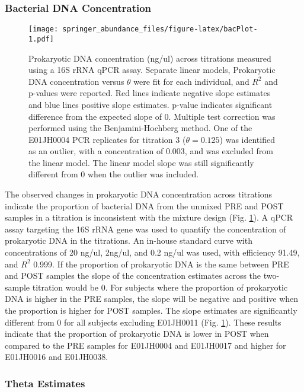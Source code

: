 \documentclass[smallextended]{svjour3}       %
\begin{document}
\hypertarget{bacterial-dna-concentration}{%
\subsubsection{Bacterial DNA
Concentration}\label{bacterial-dna-concentration}}

\begin{figure}
\centering
\texttt{[image: springer\_abundance\_files/figure-latex/bacPlot-1.pdf]}
\caption{\label{fig:bacPlot}Prokaryotic DNA concentration (ng/ul) across
titrations measured using a 16S rRNA qPCR assay. Separate linear models,
Prokaryotic DNA concentration versus \(\theta\) were fit for each
individual, and \(R^2\) and p-values were reported. Red lines indicate
negative slope estimates and blue lines positive slope estimates.
p-value indicates significant difference from the expected slope of 0.
Multiple test correction was performed using the Benjamini-Hochberg
method. One of the E01JH0004 PCR replicates for titration 3
(\(\theta=0.125\)) was identified as an outlier, with a concentration of
0.003, and was excluded from the linear model. The linear model slope
was still significantly different from 0 when the outlier was included.}
\end{figure}

The observed changes in prokaryotic DNA concentration across titrations
indicate the proportion of bacterial DNA from the unmixed PRE and POST
samples in a titration is inconsistent with the mixture design (Fig.
\ref{fig:bacPlot}). A qPCR assay targeting the 16S rRNA gene was used to
quantify the concentration of prokaryotic DNA in the titrations. An
in-house standard curve with concentrations of 20 ng/ul, 2ng/ul, and 0.2
ng/ul was used, with efficiency 91.49, and \(R^2\) 0.999. If the
proportion of prokaryotic DNA is the same between PRE and POST samples
the slope of the concentration estimates across the two-sample titration
would be 0. For subjects where the proportion of prokaryotic DNA is
higher in the PRE samples, the slope will be negative and positive when
the proportion is higher for POST samples. The slope estimates are
significantly different from 0 for all subjects excluding E01JH0011
(Fig. \ref{fig:bacPlot}). These results indicate that the proportion of
prokaryotic DNA is lower in POST when compared to the PRE samples for
E01JH0004 and E01JH0017 and higher for E01JH0016 and E01JH0038.

\hypertarget{theta-estimates}{%
\subsubsection{Theta Estimates}\label{theta-estimates}}
\end{document}
